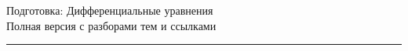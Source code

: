 \documentclass[11pt,a4paper]{article}
\newcommand{\topicsBase}{preparation/topics}
\begin{document}
\begin{center}
  {\Huge Подготовка: Дифференциальные уравнения}\\[0.4cm]
  {\large Полная версия с разборами тем и ссылками}\\[0.2cm]
  \rule{\textwidth}{0.6pt}
\end{center}

\vspace{1cm}

{
	\hypersetup{linkcolor=black}
	\tableofcontents
}

\newpage



% 
% 
\end{document}
